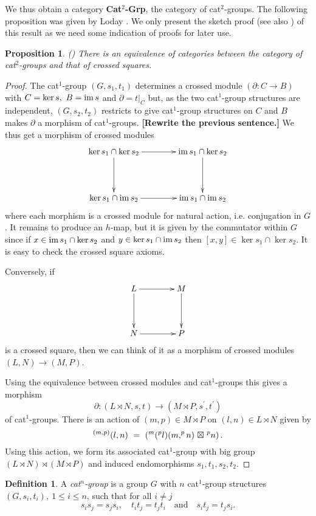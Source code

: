 \documentclass[a4paper,11pt]{article}
\theoremstyle{plain}
\newtheorem{proposition}[theorem]{Proposition}
\theoremstyle{definition}
\newtheorem{definition}[theorem]{Definition}
\begin{document}
We thus obtain a category \textbf{Cat}$^{2}$\textbf{-Grp}, 
the category of cat$^{2}$-groups. 
The following proposition was given by Loday \cite{Loday}. 
We only present the sketch proof (see also \cite{mutpor}) of this result 
as we need some indication of proofs for later use.

\begin{proposition}
	\label{loday} \emph{(\cite{Loday})} 
	There is an equivalence of categories between the category of cat$^{2}$-groups 
	and that of crossed squares.
\end{proposition}
\begin{proof}
	The cat$^{1}$-group $(G,s_1,t_1)$ determines a crossed module 
	$(\partial : C \rightarrow B)$ with $C = \ker s,~ B = \mathrm{im}\, s$ and $\partial =t|_{C}$ 
	but, as the two cat$^{1}$-group structures are independent, 
	$(G,s_2,t_2)$ restricts to give cat$^{1}$-group structures on $C$ 
	and $B$ makes $\partial $ a morphism of cat$^{1}$-groups. 
	{\bf[Rewrite the previous sentence.]} 
	We thus get a morphism of crossed modules
	\[
	\xymatrix@R=40pt@C=40pt
	{ \ker s_1 \cap \ker s_2 \ar[d] \ar[r] 
		& \im s_1 \cap \ker s_2 \ar[d] \\ 
		\ker s_1 \cap \im s_2 \ar[r] 
		& \im s_1 \cap \im s_2 } 
	\]
	\noindent where each morphism is a crossed module for natural action, 
	i.e. conjugation in $G$. 
	It remains to produce an $h$-map, but it is given by the commutator within $G$ 
	since if $x \in \mathrm{im}\, s_1 \cap \ker s_2$ 
	and $y\in \ker s_1 \cap \mathrm{im}\, s_2$ then $[x,y] \in \ker s_1 \cap \ker s_2$. 
	It is easy to check the crossed square axioms.
	
	Conversely, if
	\[
	\xymatrix@R=40pt@C=40pt
	{ L \ar[d] \ar[r] 
		& M \ar[d] \\ 
		N \ar[r] 
		& P }  
	\]
	\noindent is a crossed square, 
	then we can think of it as a morphism of crossed modules $(L,N) \rightarrow (M,P)$.
	
	Using the equivalence between crossed modules and cat$^{1}$-groups this
	gives a morphism
	\[
	\partial : (L \rtimes N,s,t) \longrightarrow (M \rtimes P, s^{\prime}, t^{\prime})
	\]
	of cat$^{1}$-groups. 
	There is an action of $(m,p) \in M \rtimes P$ on $(l,n) \in L \rtimes N$ 
	given by
	\[
	^{(m,p)}(l,n) ~=~ (^{m}(^{p}l) (m,^{p}n) {\ \boxtimes\ } ^{p}n)\,.
	\] 
	Using this action, we form its associated cat$^{1}$-group with big group 
	$(L \rtimes N) \rtimes (M \rtimes P)$ 
	and induced endomorphisms $s_1,t_1,s_2,t_2$.
\end{proof}

\begin{definition}
	A \emph{cat$^{n}$-group} is a group $G$ with $n$ cat$^{1}$-group structures  
	$(G,s_{i},t_{i}),~ 1\leq i\leq n$, such that for all $i \ne j$ 
	\[
	s_{i}s_{j} = s_{j}s_{i}, \quad 
	t_{i}t_{j} = t_{j}t_{i} \quad \mbox{and} \quad 
	s_{i}t_{j} = t_{j}s_{i}. 
	\]
\end{definition}
\end{document}
